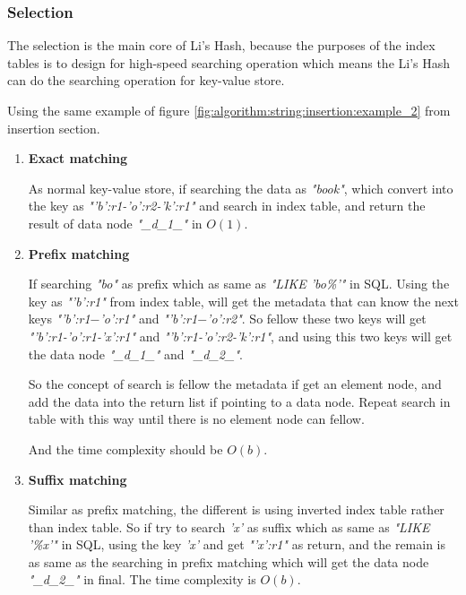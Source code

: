 \subsubsection{Selection}

The selection is the main core of Li's Hash, because the purposes of the index tables is to design for high-speed searching operation which means the Li's Hash can do the searching operation for key-value store.

Using the same example of figure \ref{fig:algorithm:string:insertion:example_2} from insertion section.

\begin{enumerate}


\item \textbf{Exact matching}

As normal key-value store, if searching the data as \textit{"book"}, which convert into the key as \textit{"'b':r1-'o':r2-'k':r1"} and search in index table, and return the result of data node \textit{"\_d\_1\_"} in $O(1)$.


\item \textbf{Prefix matching}

If searching \textit{"bo"} as prefix which as same as \textit{"LIKE 'bo\%'"} in SQL. Using the key as \textit{"'b':r1"} from index table, will get the metadata that can know the next keys \textit{"'b':r1$-$'o':r1"} and \textit{"'b':r1$-$'o':r2"}. So fellow these two keys will get \textit{"'b':r1-'o':r1-'x':r1"} and \textit{"'b':r1-'o':r2-'k':r1"}, and using this two keys will get the data node \textit{"\_d\_1\_"} and \textit{"\_d\_2\_"}.

So the concept of search is fellow the metadata if get an element node, and add the data into the return list if pointing to a data node. Repeat search in table with this way until there is no element node can fellow.

And the time complexity should be $O(b)$.


\item \textbf{Suffix matching}

Similar as prefix matching, the different is using inverted index table rather than index table. So if try to search \textit{'x'} as suffix which as same as \textit{"LIKE '\%x'"} in SQL, using the key \textit{'x'} and get \textit{"'x':r1"} as return, and the remain is as same as the searching in prefix matching which will get the data node \textit{"\_d\_2\_"} in final. The time complexity is $O(b)$.


\end{enumerate}

